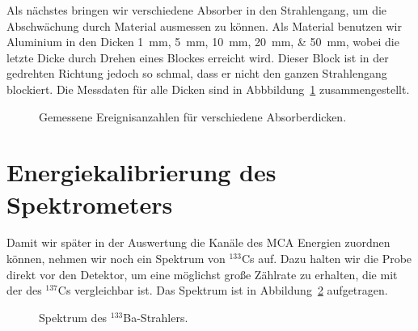\documentclass[11pt, ngerman, fleqn, DIV=15, headinclude, BCOR=2cm]{scrreprt}
\begin{document}
Als nächstes bringen wir verschiedene Absorber in den Strahlengang, um die
Abschwächung durch Material ausmessen zu können. Als Material benutzen wir
Aluminium in den Dicken \SIlist{1;5;10;20;50}{\milli\meter}, wobei die letzte
Dicke durch Drehen eines Blockes erreicht wird. Dieser Block ist in der
gedrehten Richtung jedoch so schmal, dass er nicht den ganzen Strahlengang
blockiert. Die Messdaten für alle Dicken sind in
Abbbildung~\ref{fig:absorber_roh} zusammengestellt.

\begin{figure}[htbp]
    \centering
    \caption{%
        Gemessene Ereignisanzahlen für verschiedene Absorberdicken.
    }
    \label{fig:absorber_roh}
\end{figure}

\section{Energiekalibrierung des Spektrometers}

Damit wir später in der Auswertung die Kanäle des MCA Energien zuordnen können,
nehmen wir noch ein Spektrum von $^{133}$Cs auf. Dazu halten wir die Probe
direkt vor den Detektor, um eine möglichst große Zählrate zu erhalten, die mit
der des $^{137}$Cs vergleichbar ist. Das Spektrum ist in
Abbildung~\ref{fig:barium_roh} aufgetragen.

\begin{figure}[htbp]
    \centering
    \caption{%
        Spektrum des $^{133}$Ba-Strahlers.
    }
    \label{fig:barium_roh}
\end{figure}
\end{document}
